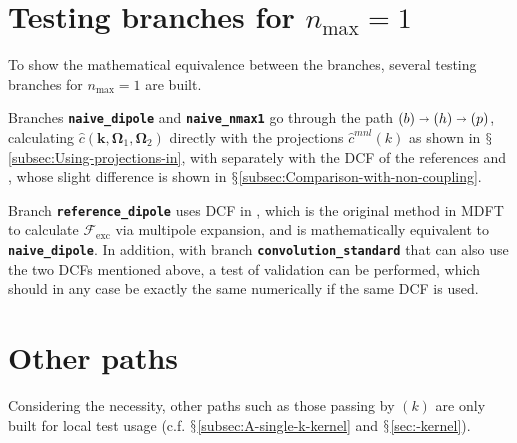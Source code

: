 \section{Testing branches for $n_{\max}=1$}

To show the mathematical equivalence between the branches, several
testing branches for $n_{\max}=1$ are built.

Branches \texttt{\textbf{naive\_dipole}} and \texttt{\textbf{naive\_nmax1}}
go through the path $\left(b\right)\shortrightarrow\left(h\right)\shortrightarrow\left(p\right)$,
calculating $\hat{c}(\mathbf{k},\mathbf{\Omega}_{1},\mathbf{\Omega}_{2})$
directly with the projections $\hat{c}^{mnl}(k)$ as shown in $\mathsection$\ref{subsec:Using-projections-in},
with separately with the \acs{DCF} of the references \citep{zhao_accurate_2013}
and \citep{puibasset_bridge_2012}, whose slight difference is shown
in $\mathsection$\ref{subsec:Comparison-with-non-coupling}. 

Branch \texttt{\textbf{reference\_dipole}} uses \acs{DCF} in \citep{zhao_accurate_2013},
which is the original method in \acs{MDFT} to calculate $\mathcal{F}_{\mathrm{exc}}$
via multipole expansion, and is mathematically equivalent to \texttt{\textbf{naive\_dipole}}.
In addition, with branch \texttt{\textbf{convolution\_standard}} that
can also use the two \acs{DCF}s mentioned above, a test of validation
can be performed, which should in any case be exactly the same numerically
if the same \acs{DCF} is used.

\section{Other paths}

Considering the necessity, other paths such as those passing by $\left(k\right)$
are only built for local test usage (c.f. $\mathsection$\ref{subsec:A-single-k-kernel}
and $\mathsection$\ref{sec:-kernel}).
